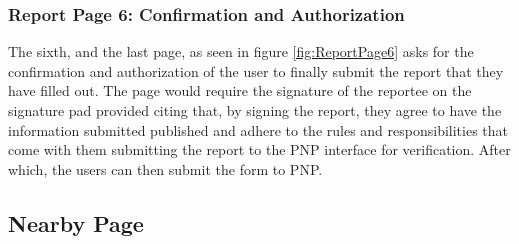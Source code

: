 \subsubsection{Report Page 6: Confirmation and Authorization}

The sixth, and the last page, as seen in figure \ref{fig:ReportPage6} asks for the confirmation and authorization of the user to finally submit the report that they have filled out. The page would require the signature of the reportee on the signature pad provided citing that, by signing the report, they agree to have the information submitted published and adhere to the rules and responsibilities that come with them submitting the report to the PNP interface for verification. After which, the users can then submit the form to PNP.

\subsection{Nearby Page}

